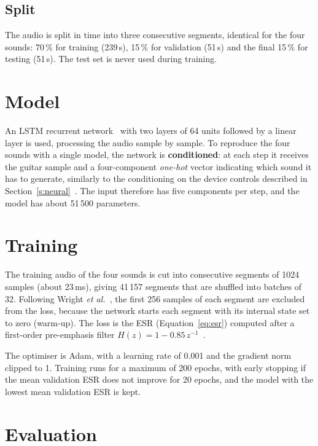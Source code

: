 \documentclass[ENG]{TFUOC}%
\begin{document}
\subsection{Split}

The audio is split in time into three consecutive segments, identical for the four sounds: 70\,\% for training (239\,s), 15\,\% for validation (51\,s) and the final 15\,\% for testing (51\,s). The test set is never used during training.

\section{Model}

An LSTM recurrent network~\cite{hochreiter1997} with two layers of 64 units followed by a linear layer is used, processing the audio sample by sample. To reproduce the four sounds with a single model, the network is \textbf{conditioned}: at each step it receives the guitar sample and a four-component \emph{one-hot} vector indicating which sound it has to generate, similarly to the conditioning on the device controls described in Section~\ref{s:neural}~\cite{wright2020,juvela2023}. The input therefore has five components per step, and the model has about 51\,500 parameters.

\section{Training}

The training audio of the four sounds is cut into consecutive segments of 1024 samples (about 23\,ms), giving 41\,157 segments that are shuffled into batches of 32. Following Wright \emph{et al.}~\cite{wright2019}, the first 256 samples of each segment are excluded from the loss, because the network starts each segment with its internal state set to zero (warm-up). The loss is the ESR (Equation~\eqref{eq:esr}) computed after a first-order pre-emphasis filter $H(z)=1-0.85\,z^{-1}$~\cite{wright2020percep}.

The optimiser is Adam, with a learning rate of 0.001 and the gradient norm clipped to 1. Training runs for a maximum of 200 epochs, with early stopping if the mean validation ESR does not improve for 20 epochs, and the model with the lowest mean validation ESR is kept.

\section{Evaluation}
\end{document}
